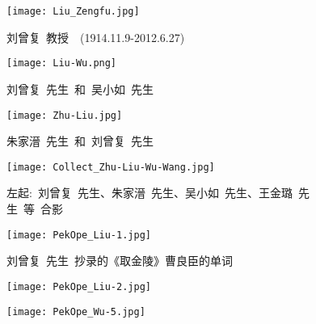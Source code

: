 \newpage
\pagestyle{empty}    %
\begin{figure}[h!]
\centering
\vspace{+0.2in}
\texttt{[image: Liu\_Zengfu.jpg]}
\caption*{\hei 刘曾复~教授~~(1914.11.9-2012.6.27)}
\label{Liu_Zengfu}
\end{figure}

\begin{figure}[h!]
\centering
\texttt{[image: Liu-Wu.png]}
\caption*{\hei 刘曾复~先生~和~吴小如~先生}
\label{Collect_Liu_Wu}
\end{figure}

\begin{figure}[h!]
\centering
\texttt{[image: Zhu-Liu.jpg]}
\caption*{\hei 朱家溍~先生~和~刘曾复~先生}
\label{Collect_Zhu_Wu}
\end{figure}

\begin{figure}[h!]
\centering
\texttt{[image: Collect\_Zhu-Liu-Wu-Wang.jpg]}
\caption*{\hei 左起:~刘曾复~先生、朱家溍~先生、吴小如~先生、王金璐~先生~等~合影}
\label{Collect_Liy_Zhu_Wu_Wang}
\end{figure}

\begin{figure}[h!]
\centering
\vspace{-0.7in}
\texttt{[image: PekOpe\_Liu-1.jpg]}
\caption*{\hei 刘曾复~先生~抄录的《取金陵》曹良臣的单词}
\label{Script}
\end{figure}

\begin{figure}[hbtp!]
\hspace*{-0.5in}
\begin{minipage}[t]{0.53\textwidth}
	\centering
	\texttt{[image: PekOpe\_Liu-2.jpg]}
	\caption*{\hei \fontsize{8.5pt}{4.0pt}\selectfont{左:~刘曾复~先生~保存的部分说戏录音磁带}}
\end{minipage}
\hspace{0.6in}
\begin{minipage}[t]{0.43\textwidth}
	\centering
	\vspace{-3.7in}
	\texttt{[image: PekOpe\_Wu-5.jpg]}
	\caption*{\hei \fontsize{8.5pt}{4.0pt}\selectfont{右:吴小如~先生~保存的刘曾复先生的说戏录音磁带}}
\end{minipage}
\label{Records}
\end{figure}


